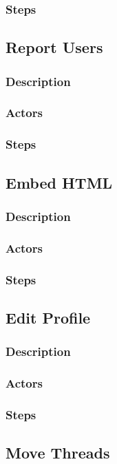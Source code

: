 \documentclass[12pt]{scrartcl}
\begin{document}
\subsubsection{Steps}


\subsection{Report Users}
\subsubsection{Description}
\subsubsection{Actors}
\subsubsection{Steps}

\subsection{Embed HTML}
\subsubsection{Description}
\subsubsection{Actors}
\subsubsection{Steps}

\subsection{Edit Profile}
\subsubsection{Description}
\subsubsection{Actors}
\subsubsection{Steps}

\subsection{Move Threads}
\end{document}
